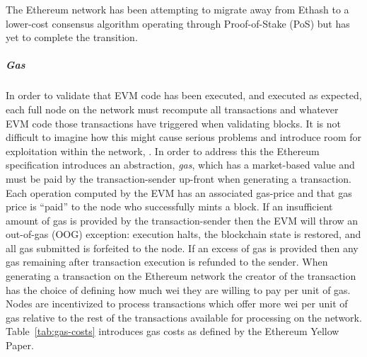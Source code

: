 The Ethereum network has been attempting to migrate away from Ethash to a
lower-cost consensus algorithm operating through Proof-of-Stake (PoS) but has
yet to complete the transition.


\subparagraph{Gas}
In order to validate that EVM code has been executed, and executed as expected,
each full node on the network must recompute all transactions and whatever EVM
code those transactions have triggered when validating blocks. It is not
difficult to imagine how this might cause serious problems and introduce room
for exploitation within the network, .
In order to address this the Ethereum specification introduces an abstraction,
\emph{gas}, which has a market-based value and must be paid by the
transaction-sender up-front when generating a transaction. Each operation
computed by the EVM has an associated gas-price and that gas price is ``paid''
to the node who successfully mints a block. If an insufficient amount of gas is
provided by the transaction-sender then the EVM will throw an out-of-gas (OOG)
exception: execution halts, the blockchain state is restored, and all gas
submitted is forfeited to the node. If an excess of gas is provided then any gas
remaining after transaction execution is refunded to the sender. When generating
a transaction on the Ethereum network the creator of the transaction has the
choice of defining how much wei they are willing to pay per unit of gas. Nodes
are incentivized to process transactions which offer more wei per unit of gas
relative to the rest of the transactions available for processing on the
network. Table~\ref{tab:gas-costs} introduces gas costs as defined by the
Ethereum Yellow Paper.



